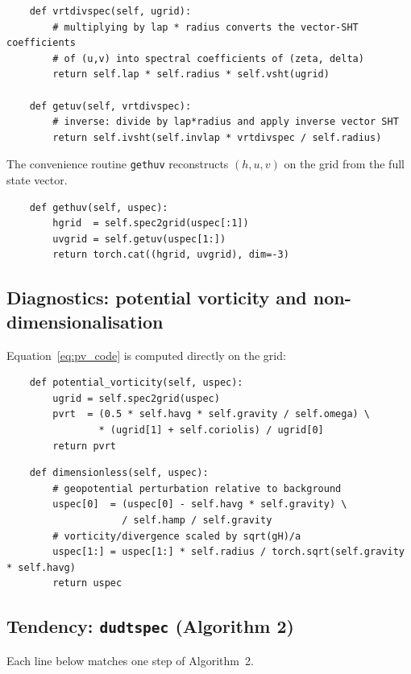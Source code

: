 \documentclass[11pt]{article}
\begin{document}
\begin{lstlisting}
    def vrtdivspec(self, ugrid):
        # multiplying by lap * radius converts the vector-SHT coefficients
        # of (u,v) into spectral coefficients of (zeta, delta)
        return self.lap * self.radius * self.vsht(ugrid)

    def getuv(self, vrtdivspec):
        # inverse: divide by lap*radius and apply inverse vector SHT
        return self.ivsht(self.invlap * vrtdivspec / self.radius)
\end{lstlisting}

\noindent
The convenience routine \texttt{gethuv} reconstructs $(h,u,v)$ on the
grid from the full state vector.

\begin{lstlisting}
    def gethuv(self, uspec):
        hgrid  = self.spec2grid(uspec[:1])
        uvgrid = self.getuv(uspec[1:])
        return torch.cat((hgrid, uvgrid), dim=-3)
\end{lstlisting}

\subsection{Diagnostics: potential vorticity and non-dimensionalisation}

Equation~\eqref{eq:pv_code} is computed directly on the grid:

\begin{lstlisting}
    def potential_vorticity(self, uspec):
        ugrid = self.spec2grid(uspec)
        pvrt  = (0.5 * self.havg * self.gravity / self.omega) \
                * (ugrid[1] + self.coriolis) / ugrid[0]
        return pvrt
\end{lstlisting}

\begin{lstlisting}
    def dimensionless(self, uspec):
        # geopotential perturbation relative to background
        uspec[0]  = (uspec[0] - self.havg * self.gravity) \
                    / self.hamp / self.gravity
        # vorticity/divergence scaled by sqrt(gH)/a
        uspec[1:] = uspec[1:] * self.radius / torch.sqrt(self.gravity * self.havg)
        return uspec
\end{lstlisting}

\subsection{Tendency: \texttt{dudtspec} (Algorithm 2)}

Each line below matches one step of Algorithm~2.
\end{document}
